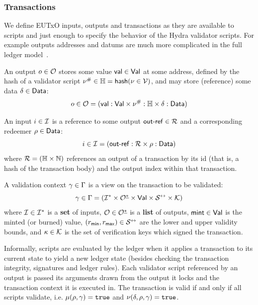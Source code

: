 \subsubsection{Transactions}

We define EUTxO inputs, outputs and transactions as they are available to
scripts and just enough to specify the behavior of the Hydra validator scripts.
For example outputs addresses and datums are much more complicated in the full
ledger model~\cite{eutxo-2, ledger-shelley-spec}.

\begin{definition}[Outputs]
  An output $o \in \mathcal{O}$ stores some value $\mathsf{val} \in \mathsf{Val}$ at some address,
  defined by the hash of a validator script $\nu^{\#} \in \mathbb{H} = \mathsf{hash}(\nu \in \mathcal{V})$,
  and may store (reference) some data $\delta \in \mathsf{Data}$:
  \[
    o \in \mathcal{O} = (\mathsf{val} : \mathsf{Val} \times \nu^{\#} : \mathbb{H} \times \delta : \mathsf{Data})
  \]
\end{definition}

\begin{definition}[Inputs]
  An input $i \in \mathcal{I}$ is a reference to some output
  $\mathsf{out\textsf{-}{}ref} \in \mathcal{R}$ and a corresponding redeemer $\rho \in \mathsf{Data}$:
  \[
    i \in \mathcal{I} = (\mathsf{out\textsf{-}{}ref} : \mathcal{R} \times \rho : \mathsf{Data})
  \]
  where $\mathcal{R} = (\mathbb{H} \times \mathbb{N})$ references an output of a
  transaction by its id (that is, a hash of the transaction body) and the output
  index within that transaction.
\end{definition}

\begin{definition}
  A validation context $\gamma \in \Gamma$ is a view on the transaction
  to be validated:
  \[
    \gamma \in \Gamma = (\mathcal{I}^* \times \mathcal{O}^{\underline{*}} \times \mathsf{Val} \times \mathcal{S}^{\leftrightarrow} \times \mathcal{K})
  \]
  where $\mathcal{I} \in \mathcal{I}^*$ is a \textbf{set} of inputs,
  $\mathcal{O} \in \mathcal{O}^{\underline{*}}$ is a \textbf{list} of outputs,
  $\mathsf{mint} \in \mathsf{Val}$ is the minted (or burned) value,
  $(r_{\mathsf{min}}, r_{\mathsf{max}}) \in \mathcal{S}^{\leftrightarrow}$
   are
  the lower and upper validity bounds, and $\kappa \in \mathcal{K}$ is the set
  of verification keys which signed the transaction.
\end{definition}

Informally, scripts are evaluated by the ledger when it applies a transaction to
its current state to yield a new ledger state (besides checking the transaction
integrity, signatures and ledger rules). Each validator script referenced by
an output is passed its arguments drawn from the output it locks and the
transaction context it is executed in. The transaction is valid if and only if
all scripts validate, i.e. $\mu(\rho, \gamma) = \mathtt{true}$ and
$\nu(\delta, \rho, \gamma) = \mathtt{true}$.

